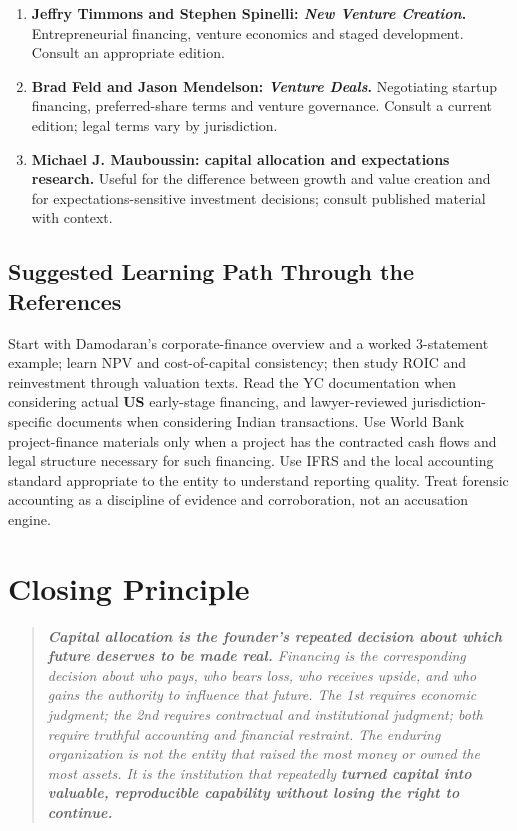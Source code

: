 \begin{enumerate}
    \item \textbf{Jeffry Timmons and Stephen Spinelli: \textit{New Venture Creation}.} Entrepreneurial financing, venture economics and staged development. Consult an appropriate edition.
    \item \textbf{Brad Feld and Jason Mendelson: \textit{Venture Deals}.} Negotiating startup financing, preferred-share terms and venture governance. Consult a current edition; legal terms vary by jurisdiction.
    \item \textbf{Michael J. Mauboussin: capital allocation and expectations research.} Useful for the difference between growth and value creation and for expectations-sensitive investment decisions; consult published material with context.
\end{enumerate}

\subsection*{Suggested Learning Path Through the References}

Start with Damodaran's corporate-finance overview and a worked 3-statement example; learn NPV and cost-of-capital consistency; then study ROIC and reinvestment through valuation texts. Read the YC documentation when considering actual \textbf{US} early-stage financing, and lawyer-reviewed jurisdiction-specific documents when considering Indian transactions. Use World Bank project-finance materials only when a project has the contracted cash flows and legal structure necessary for such financing. Use IFRS and the local accounting standard appropriate to the entity to understand reporting quality. Treat forensic accounting as a discipline of evidence and corroboration, not an accusation engine.

\section*{Closing Principle}

\begin{quote}
\itshape
\textbf{Capital allocation is the founder's repeated decision about which future deserves to be made real.} Financing is the corresponding decision about who pays, who bears loss, who receives upside, and who gains the authority to influence that future. The 1st requires economic judgment; the 2nd requires contractual and institutional judgment; both require truthful accounting and financial restraint. The enduring organization is not the entity that raised the most money or owned the most assets. It is the institution that repeatedly \textbf{turned capital into valuable, reproducible capability without losing the right to continue.}
\end{quote}
